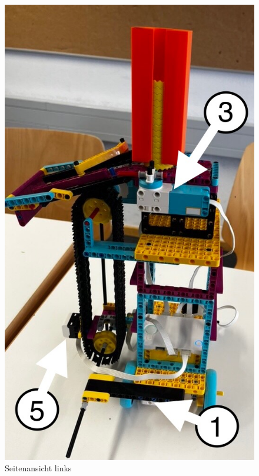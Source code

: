 \begin{figure}[H]
	\centering
	\begin{minipage}[b]{0.48\linewidth}
		\centering
		\includegraphics[width=\linewidth]{images/188CF006-D571-4F2D-9337-8C4BDD7DAAEF_1_105_c}
		\caption{Seitenansicht links}
		\label{fig:seitenansicht-links}
	\end{minipage}
	\hfill
	\begin{minipage}[b]{0.48\linewidth}

\end{minipage}
\end{figure}
